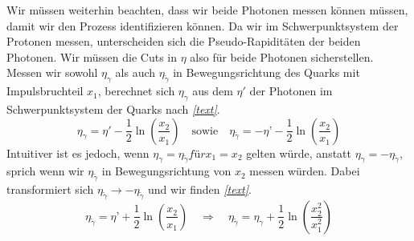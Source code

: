 \newline
Wir müssen weiterhin beachten, dass wir beide Photonen messen können müssen, damit wir den Prozess identifizieren können. Da wir im Schwerpunktsystem der Protonen messen, unterscheiden sich die Pseudo-Rapiditäten der beiden Photonen. Wir müssen die Cuts in $\eta$ also für beide Photonen sicherstellen. Messen wir sowohl $\eta_{\gamma}$ als auch $\eta_{\tilde{\gamma}}$ in Bewegungsrichtung des Quarks mit Impulsbruchteil $x_1$, berechnet sich $\eta_{\gamma}$ aus dem $\eta'$ der Photonen im Schwerpunktsystem der Quarks nach \textit{\autoref{text}}.
\begin{equation}
	\eta_{\gamma} = \eta' -\frac{1}{2}\ln(\frac{x_2}{x_1}) \quad \text{sowie} \quad \eta_{\tilde{\gamma}} = -\eta’ - \frac{1}{2}\ln(\frac{x_2}{x_1})
\end{equation}
Intuitiver ist es jedoch, wenn $\eta_{\gamma} = \eta_{\tilde{\gamma}} für x_1 = x_2$ gelten würde, anstatt $\eta_{\gamma} = - \eta_{\tilde{\gamma}}$, sprich wenn wir $\eta_{\tilde{\gamma}}$ in Bewegungsrichtung von $x_2$ messen würden. Dabei transformiert sich $\eta_{\tilde{\gamma}} \rightarrow -\eta_{\tilde{\gamma}}$ und wir finden \textit{\autoref{text}}.
\begin{equation}
	\eta_{\tilde{\gamma}} = \eta’ + \frac{1}{2}\ln(\frac{x_2}{x_1}) \quad \Rightarrow \quad \eta_{\tilde{\gamma}} = \eta_{\gamma} + \frac{1}{2}  \ln(\frac{x_2^2}{x_1^2})
\end{equation}
